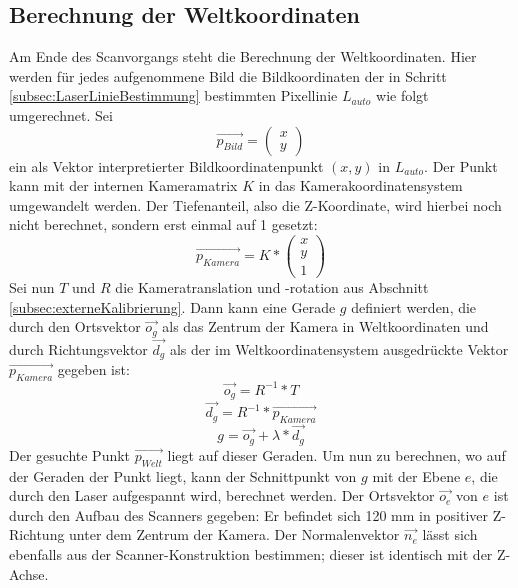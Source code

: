 \subsection{Berechnung der Weltkoordinaten}
\label{subsec:weltkoordinaten}
Am Ende des Scanvorgangs steht die Berechnung der Weltkoordinaten. Hier werden für jedes aufgenommene Bild die Bildkoordinaten der in Schritt \ref{subsec:LaserLinieBestimmung} bestimmten Pixellinie \(L_{auto}\) wie folgt umgerechnet. Sei 
\begin{equation}
\vec{p_{Bild}} = \left(\begin{array}{c}x\\y\end{array}\right)
\end{equation} 
ein als Vektor interpretierter Bildkoordinatenpunkt \((x, y)\) in \(L_{auto}\). Der Punkt kann mit der internen Kameramatrix \(K\) in das Kamerakoordinatensystem umgewandelt werden. Der Tiefenanteil, also die Z-Koordinate, wird hierbei noch nicht berechnet, sondern erst einmal auf 1 gesetzt:
\begin{equation}
\vec{p_{Kamera}}  = K * \left(\begin{array}{c}x\\y\\1\end{array}\right)
\end{equation}
Sei nun \(T\) und \(R\) die Kameratranslation und -rotation aus Abschnitt \ref{subsec:externeKalibrierung}. Dann kann eine Gerade \(g\) definiert werden, die durch den Ortsvektor \(\vec{o_{g}}\) als das Zentrum der Kamera in Weltkoordinaten und durch Richtungsvektor \(\vec{d_{g}}\) als der im Weltkoordinatensystem ausgedrückte Vektor \(\vec{p_{Kamera}}\) gegeben ist:
\begin{equation}
\vec{o_{g}} = R^{-1} * T
\end{equation}
\begin{equation}
\vec{d_{g}} = R^{-1} * \vec{p_{Kamera}}
\end{equation}
\begin{equation}
g = \vec{o_{g}} + \lambda * \vec{d_{g}}
\end{equation}
Der gesuchte Punkt \(\vec{p_{Welt}}\) liegt auf dieser Geraden. Um nun zu berechnen, wo auf der Geraden der Punkt liegt, kann der Schnittpunkt von \(g\) mit der Ebene \(e\), die durch den Laser aufgespannt wird, berechnet werden. Der Ortsvektor \(\vec{o_{e}}\) von \(e\) ist durch den Aufbau des Scanners gegeben: Er befindet sich 120 mm in positiver Z-Richtung unter dem Zentrum der Kamera. Der Normalenvektor \(\vec{n_{e}}\) lässt sich ebenfalls aus der Scanner-Konstruktion bestimmen; dieser ist identisch mit der Z-Achse.
